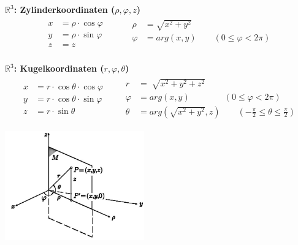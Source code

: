 \documentclass[a4paper]{article}
\begin{document}
    \vspace{-8mm}
	\begin{multicols}{2}
	\textbf{$\mathbb{R}^3$: Zylinderkoordinaten ($\rho, \varphi, z$)}
		\vspace{-1mm}
		\begin{eqnarray*}
				\begin{aligned}
				x &= \rho \cdot \cos \varphi\\
				y &= \rho \cdot \sin \varphi\\ 
				z &= z
				\end{aligned}
					&\quad&
				\begin{aligned}
					\rho &= \sqrt{x^2 + y^2}\\
					\varphi &= arg(x,y) \qquad (0 \le \varphi < 2 \pi)\\
					\\
				\end{aligned}
		\end{eqnarray*}
		\vspace{-2mm}

	\textbf{$\mathbb{R}^3$: Kugelkoordinaten ($r, \varphi, \theta$) }
		\vspace{-1mm}
		\begin{eqnarray*}
					\begin{aligned}
					x &= r \cdot \cos\theta \cdot \cos\varphi\\ 
					y &= r \cdot \cos\theta \cdot \sin\varphi\\
					z &= r \cdot \sin\theta
				\end{aligned}
					&\ &
				\begin{aligned} 
					r &= \sqrt[]{x^2 + y^2 + z^2}\\
					\varphi &= arg(x,y)              \qquad\qquad (0 \le \varphi < 2 \pi)\\
					\theta &= arg\left(\sqrt{x^2 + y^2}, z\right)  \qquad \left(-\frac{\pi}{2} \le \theta \le \frac{\pi}{2}\right)
				\end{aligned}
		\end{eqnarray*}

		\hspace{5mm}
		\includegraphics[width=6cm]{Koordinaten_Kugel_Zylinder.jpg}
		
    \end{multicols}
\end{document}
